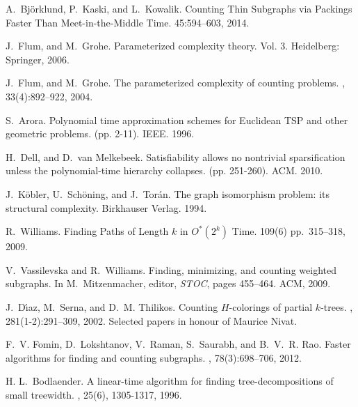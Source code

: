 \documentclass[a4paper,11pt]{report}
\theoremstyle{plain}
\theoremstyle{definition}
\begin{document}
\begin{thebibliography}{10}

A.~Bj{\"o}rklund, P.~Kaski, and L.~Kowalik.
\newblock Counting Thin Subgraphs via Packings Faster Than Meet-in-the-Middle Time.
  45:594--603, 2014.

J.~Flum, and M.~Grohe.
\newblock Parameterized complexity theory.  Vol. 3.
\newblock Heidelberg: Springer, 2006.

J.~Flum, and M.~Grohe.
\newblock The parameterized complexity of counting problems.
, 33(4):892--922, 2004.

S.~Arora.
\newblock Polynomial time approximation schemes for Euclidean TSP and other geometric problems.
 (pp. 2-11). IEEE. 1996.

H.~Dell, and D.~van Melkebeek.
\newblock Satisfiability allows no nontrivial sparsification unless the polynomial-time hierarchy collapses.
 (pp. 251-260). ACM. 2010.

J.~Köbler, U.~Schöning, and J.~Torán.
\newblock The graph isomorphism problem: its structural complexity.
\newblock Birkhauser Verlag. 1994.

R.~Williams.
\newblock Finding Paths of Length $k$ in $O^*(2^k)$ Time.
 109(6) pp.~315--318, 2009.

V.~Vassilevska and R.~Williams.
\newblock Finding, minimizing, and counting weighted subgraphs.
\newblock In M.~Mitzenmacher, editor, {\em STOC}, pages 455--464. ACM, 2009.

J.~D{\'{\i}}az, M.~Serna, and D.~M. Thilikos.
\newblock Counting {$H$}-colorings of partial {$k$}-trees.
, 281(1-2):291--309, 2002.
\newblock Selected papers in honour of Maurice Nivat.

F.~V. Fomin, D.~Lokshtanov, V.~Raman, S.~Saurabh, and B.~V.~R. Rao.
\newblock Faster algorithms for finding and counting subgraphs.
, 78(3):698--706, 2012.

H. L.~Bodlaender.
\newblock A linear-time algorithm for finding tree-decompositions of small treewidth.
, 25(6), 1305-1317, 1996.


\end{thebibliography}
\end{document}
